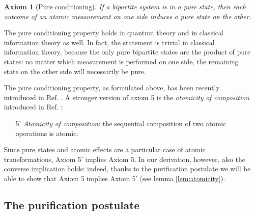 \documentclass[12pt,aps,pra,showpacs,groupedaddress]{revtex4-1}
\newtheorem{axiom}{Axiom}\newtheorem{postulate}{Postulate}
\begin{document}
\begin{axiom}[Pure conditioning]
  If a bipartite system is in a pure state, then each outcome of an atomic measurement on one side
  induces a pure state on the other.  \label{purecond}
\end{axiom}

The pure conditioning property holds in quantum theory and in classical information theory as well.
In fact, the statement is trivial in classical information theory,
because the only pure bipartite states are the product of pure states:
no matter which measurement is performed on one side, the remaining
state on the other side will necessarily be pure.  


The pure conditioning property, as formulated above, has been recently introduced in Ref. \cite{pcond}. 
A stronger version of axiom 5 is the \emph{atomicity of composition} introduced in Ref.
\cite{maurolast}:
\begin{enumerate} \item[5'] \emph{Atomicity of composition}: the
  sequential composition of two atomic operations is atomic. 
\end{enumerate}
Since pure states and atomic effects are a particular case of atomic transformations, Axiom 5' implies Axiom 5.
In our derivation, however, also the converse implication holds: indeed, thanks to the purification postulate we will be able to show that Axiom 5 implies Axiom 5' (see lemma \ref{lem:atomicity}).

   
\subsection{The purification postulate}
\end{document}
